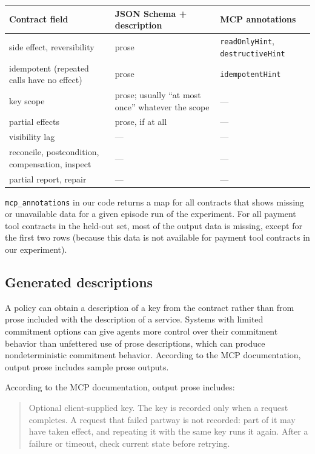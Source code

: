 \documentclass[letterpaper,twocolumn,10pt]{article}
\begin{document}
\begin{table}[t]
\centering
\footnotesize
\begin{tabularx}{\textwidth}{XXX}
\toprule
\textbf{Contract field} & \textbf{JSON Schema + description} & \textbf{MCP annotations} \\
\midrule
side effect, reversibility & prose & \texttt{readOnlyHint}, \texttt{destructiveHint} \\
idempotent (repeated calls have no effect) & prose & \texttt{idempotentHint} \\
key scope & prose; usually ``at most once'' whatever the scope & --- \\
partial effects & prose, if at all & --- \\
visibility lag & --- & --- \\
reconcile, postcondition, compensation, inspect & --- & --- \\
partial report, repair & --- & --- \\
\bottomrule
\end{tabularx}

\end{table}

\texttt{mcp\_annotations} in our code returns a map for all contracts that shows missing or unavailable data for a given episode run of the experiment. For all payment tool contracts in the held-out set, most of the output data is missing, except for the first two rows (because this data is not available for payment tool contracts in our experiment).

\subsection{Generated descriptions}\label{sec:3.3}

A policy can obtain a description of a key from the contract rather than from prose included with the description of a service. Systems with limited commitment options can give agents more control over their commitment behavior than unfettered use of prose descriptions, which can produce nondeterministic commitment behavior. According to the MCP documentation, output prose includes sample prose outputs.

According to the MCP documentation, output prose includes:

\begin{quote}Optional client-supplied key. The key is recorded only when a request completes. A request that failed partway is not recorded: part of it may have taken effect, and repeating it with the same key runs it again. After a failure or timeout, check current state before retrying.\end{quote}
\end{document}
